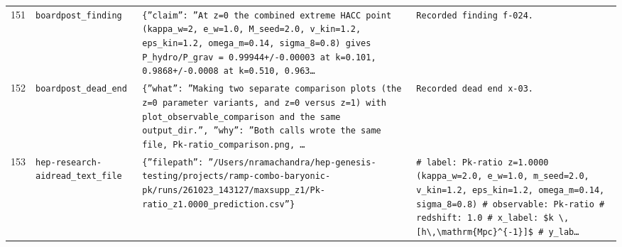 \documentclass[11pt,a4paper]{article}
\begin{document}
\begin{longtable}{@{}p{}p{}p{}p{}@{}}
151 & \texttt{board}\newline\texttt{post\_\allowbreak{}finding} & \texttt{\{''claim'':\allowbreak{} ''At z=\allowbreak{}0 the combined extreme HACC point (kappa\_\allowbreak{}w=\allowbreak{}2,\allowbreak{} e\_\allowbreak{}w=\allowbreak{}1.0,\allowbreak{} M\_\allowbreak{}seed=\allowbreak{}2.0,\allowbreak{} v\_\allowbreak{}kin=\allowbreak{}1.2,\allowbreak{} eps\_\allowbreak{}kin=\allowbreak{}1.2,\allowbreak{} omega\_\allowbreak{}m=\allowbreak{}0.14,\allowbreak{} sigma\_\allowbreak{}8=\allowbreak{}0.8)\allowbreak{} gives P\_\allowbreak{}hydro/\allowbreak{}P\_\allowbreak{}grav =\allowbreak{} 0.99944+/\allowbreak{}-0.00003 at k=\allowbreak{}0.101,\allowbreak{} 0.9868+/\allowbreak{}-0.0008 at k=\allowbreak{}0.510,\allowbreak{} 0.963\ldots{}\allowbreak{}} & \texttt{Recorded finding f-024.} \\
152 & \texttt{board}\newline\texttt{post\_\allowbreak{}dead\_\allowbreak{}end} & \texttt{\{''what'':\allowbreak{} ''Making two separate comparison plots (the z=\allowbreak{}0 parameter variants,\allowbreak{} and z=\allowbreak{}0 versus z=\allowbreak{}1)\allowbreak{} with plot\_\allowbreak{}observable\_\allowbreak{}comparison and the same output\_\allowbreak{}dir.'',\allowbreak{} ''why'':\allowbreak{} ''Both calls wrote the same file,\allowbreak{} Pk-ratio\_\allowbreak{}comparison.png,\allowbreak{} \ldots{}\allowbreak{}} & \texttt{Recorded dead end x-03.} \\
153 & \texttt{hep-research-aid}\newline\texttt{read\_\allowbreak{}text\_\allowbreak{}file} & \texttt{\{''filepath'':\allowbreak{} ''/\allowbreak{}Users/\allowbreak{}nramachandra/\allowbreak{}hep-genesis-testing/\allowbreak{}projects/\allowbreak{}ramp-combo-baryonic-pk/\allowbreak{}runs/\allowbreak{}261023\_\allowbreak{}143127/\allowbreak{}maxsupp\_\allowbreak{}z1/\allowbreak{}Pk-ratio\_\allowbreak{}z1.0000\_\allowbreak{}prediction.csv''\}\allowbreak{}} & \texttt{\# label:\allowbreak{} Pk-ratio z=\allowbreak{}1.0000 (kappa\_\allowbreak{}w=\allowbreak{}2.0,\allowbreak{} e\_\allowbreak{}w=\allowbreak{}1.0,\allowbreak{} m\_\allowbreak{}seed=\allowbreak{}2.0,\allowbreak{} v\_\allowbreak{}kin=\allowbreak{}1.2,\allowbreak{} eps\_\allowbreak{}kin=\allowbreak{}1.2,\allowbreak{} omega\_\allowbreak{}m=\allowbreak{}0.14,\allowbreak{} sigma\_\allowbreak{}8=\allowbreak{}0.8)\allowbreak{} \# observable:\allowbreak{} Pk-ratio \# redshift:\allowbreak{} 1.0 \# x\_\allowbreak{}label:\allowbreak{} \$k \textbackslash{}\allowbreak{},\allowbreak{} [h\textbackslash{}\allowbreak{},\allowbreak{}\textbackslash{}\allowbreak{}mathrm\{Mpc\}\allowbreak{}\textasciicircum{}\allowbreak{}\{-1\}\allowbreak{}]\allowbreak{}\$ \# y\_\allowbreak{}lab\ldots{}\allowbreak{}} \\

\end{longtable}
\end{document}
